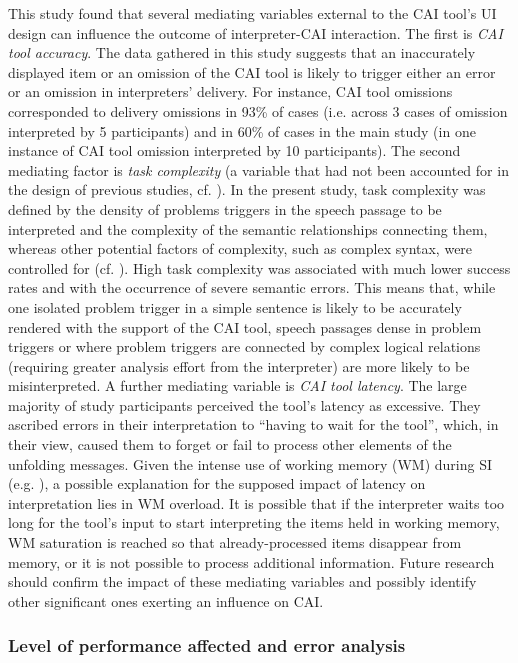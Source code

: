 This study found that several mediating variables external to the CAI tool’s UI design can influence the outcome of interpreter-CAI interaction. The first is \textit{CAI tool accuracy}. The data gathered in this study suggests that an inaccurately displayed item or an omission of the CAI tool is likely to trigger either an error or an omission in interpreters’ delivery. For instance, CAI tool omissions corresponded to delivery omissions in 93\% of cases (i.e. across 3 cases of omission interpreted by 5 participants) and in 60\% of cases in the main study (in one instance of CAI tool omission interpreted by 10 participants). The second mediating factor is \textit{task complexity} (a variable that had not been accounted for in the design of previous studies, cf. ). In the present study, task complexity was defined by the density of problems triggers in the speech passage to be interpreted and the complexity of the semantic relationships connecting them, whereas other potential factors of complexity, such as complex syntax, were controlled for (cf. ). High task complexity was associated with much lower success rates and with the occurrence of severe semantic errors. This means that, while one isolated problem trigger in a simple sentence is likely to be accurately rendered with the support of the CAI tool, speech passages dense in problem triggers or where problem triggers are connected by complex logical relations (requiring greater analysis effort from the interpreter) are more likely to be misinterpreted. A further mediating variable is \textit{CAI tool latency}. The large majority of study participants perceived the tool’s latency as excessive. They ascribed errors in their interpretation to ``having to wait for the tool'', which, in their view, caused them to forget or fail to process other elements of the unfolding messages. Given the intense use of working memory (WM) during SI (e.g. \cite{cowan2000processing,mizuno2005process}), a possible explanation for the supposed impact of latency on interpretation lies in WM overload. It is possible that if the interpreter waits too long for the tool’s input to start interpreting the items held in working memory, WM saturation is reached so that already-processed items disappear from memory, or it is not possible to process additional information. Future research should confirm the impact of these mediating variables and possibly identify other significant ones exerting an influence on CAI.

\subsubsection{Level of performance affected and error analysis}


